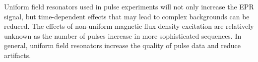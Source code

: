 Uniform field resonators used in pulse experiments will not only increase the EPR signal, but time-dependent effects that may lead to complex backgrounds can be reduced. The effects of non-uniform magnetic flux density excitation are relatively unknown as the number of pulses increase in more sophisticated sequences. In general, uniform field resonators increase the quality of pulse data and reduce artifacts. 


{\renewcommand{\bibsection}{\clearpage\section*{\bibname}\markboth{\bibname}{\bibname}}
\renewcommand{\bibname}{CHAPTER 3. REFERENCES}

}